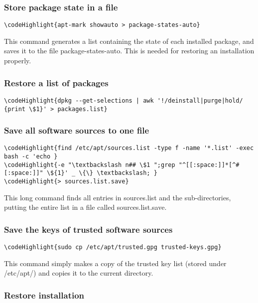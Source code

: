 \documentclass[12pt,a4paper]{article}
\begin{document}
\subsubsection{Store package state in a file}
\begin{Verbatim}[commandchars=\\\{\}]
\codeHighlight{apt-mark showauto > package-states-auto}
\end{Verbatim}
This command generates a list containing the state of each installed package, and saves it to the file package-states-auto.  This is needed for restoring an installation properly.

\subsubsection{Restore a list of packages}
\begin{Verbatim}[commandchars=\\\{\}]
\codeHighlight{dpkg --get-selections | awk '!/deinstall|purge|hold/ {print \$1}' > packages.list}
\end{Verbatim}

\subsubsection{Save all software sources to one file}
\begin{Verbatim}[commandchars=\\\{\}]
\codeHighlight{find /etc/apt/sources.list -type f -name '*.list' -exec bash -c 'echo }
\codeHighlight{-e "\textbackslash n## \$1 ";grep "^[[:space:]]*[^#[:space:]]" \${1}' _ \{\} \textbackslash; }
\codeHighlight{> sources.list.save}
\end{Verbatim}
This long command finds all entries in sources.list and the sub-directories, putting the entire list in a file called sources.list.save.

\subsubsection{Save the keys of trusted software sources}
\begin{Verbatim}[commandchars=\\\{\}]
\codeHighlight{sudo cp /etc/apt/trusted.gpg trusted-keys.gpg}
\end{Verbatim}
This command simply makes a copy of the trusted key list (stored under /etc/apt/) and copies it to the current directory.

\subsubsection{Restore installation}
\end{document}
